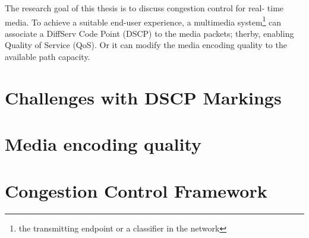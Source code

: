 
The research goal of this thesis is to discuss congestion control for real-
time media. To achieve a suitable end-user experience, a multimedia
system\footnote{the transmitting endpoint or a classifier in the network} can
associate a DiffServ Code Point (DSCP) to the media packets; therby, enabling
Quality of Service (QoS). Or it can modify the media encoding quality to the
available path capacity.

\section{Challenges with DSCP Markings}

\section{Media encoding quality}


\section{Congestion Control Framework}
